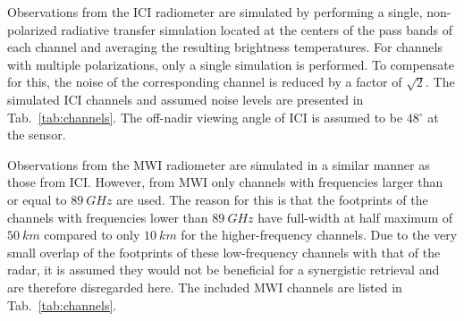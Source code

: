\documentclass[journal abbreviation, manuscript]{copernicus}
\begin{document}
Observations from the ICI radiometer are simulated by performing a single,
non-polarized radiative transfer simulation located at the centers of the pass
bands of each channel and averaging the resulting brightness temperatures. For
channels with multiple polarizations, only a single simulation is performed.
To compensate for this, the noise of the corresponding channel is reduced by a
factor of $\sqrt{2}$. The simulated ICI channels and assumed noise levels are
presented in  Tab.~\ref{tab:channels}. The off-nadir viewing angle of ICI
is assumed to be $48\unit{^\circ}$ at the sensor.

Observations from the MWI radiometer are simulated in a similar manner as those
from ICI. However, from MWI only channels with frequencies larger than or equal
to $89\ \unit{GHz}$ are used. The reason for this is that the footprints of the
channels with frequencies lower than $89\ \unit{GHz}$ have full-width at half
maximum of $50\ \unit{km}$ compared to only $10\ \unit{km}$ for the
higher-frequency channels. Due to the very small overlap of the footprints of
these low-frequency channels with that of the radar, it is assumed they would
not be beneficial for a synergistic retrieval and are therefore disregarded
here. The included MWI channels are listed in Tab.~\ref{tab:channels}.
\end{document}
